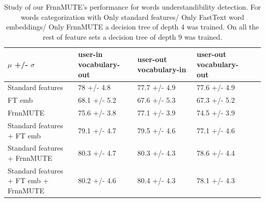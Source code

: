 \begin{table}[h]
\centering
\begin{tabular}{L|MMMN}
\hline
$\mu$ +/- $\sigma$ & user-in vocabulary-out & user-out vocabulary-in & user-out vocabulary-out \\ \hline
Standard features & 78 +/- 4.8 & 77.7 +/- 4.9 & 77.6 +/- 4.9 &\\[10pt]
FT emb & 68.1 +/- 5.2 & 67.6 +/- 5.3 & 67.3 +/- 5.2 &\\[10pt]
FrnnMUTE & 75.6 +/- 3.8 & 77.1 +/- 3.9 & 74.5 +/- 3.9 &\\[10pt]
Standard features + FT emb & 79.1 +/- 4.7 & 79.5 +/- 4.6 & 77.1 +/- 4.6 &\\[10pt]
Standard features + FrnnMUTE & 80.3 +/- 4.7 & 80.3 +/- 4.3 & 78.6 +/- 4.4 &\\[10pt]
Standard features + FT emb + FrnnMUTE & 80.2 +/- 4.6 & 80.4 +/- 4.3 & 78.1 +/- 4.3 &\\ \hline
\end{tabular}
  \caption{Study of our FrnnMUTE's performance for words understandibility detection. For words categorization with Only standard features/ Only FastText word embeddings/ Only FrnnMUTE a decision tree of depth 4 was trained. On all the rest of feature sets a decision tree of depth 9 was trained.}
  \label{tab:frnnmute}
\end{table}


